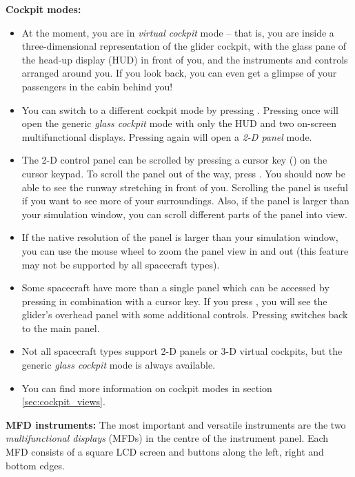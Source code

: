 \documentclass[Orbiter User Manual.tex]{subfiles}
\begin{document}
\textbf{Cockpit modes:}
\begin{itemize}
	\item At the moment, you are in \emph{virtual cockpit} mode -- that is, you
		are inside a three-dimensional representation of the glider cockpit,
		with the glass pane of the head-up display (HUD) in front of you, and
		the instruments and controls arranged around you. If you look back, you
		can even get a glimpse of your passengers in the cabin behind you!
	\item You can switch to a different cockpit mode by pressing .
		Pressing  once will open the generic \emph{glass cockpit}
		mode with only the HUD and two on-screen multifunctional displays.
		Pressing  again will open a \emph{2-D panel} mode.
	\item The 2-D control panel can be scrolled by pressing a cursor key
		(\Arrows\cur{}) on the cursor keypad. To scroll the panel out of the
		way, press \UArrow{}. You should now be able to see the runway
		stretching in front of you. Scrolling the panel is useful if you want to
		see more of your surroundings. Also, if the panel is larger than your
		simulation window, you can scroll different parts of the panel into
		view.
	\item If the native resolution of the panel is larger than your simulation
		window, you can use the mouse wheel to zoom the panel view in and out
		(this feature may not be supported by all spacecraft types).
	\item Some spacecraft have more than a single panel which can be accessed by
		pressing \Ctrl{} in combination
		with a cursor key. If you press \keystroke{\ctrl,\uarrow}, you will see
		the glider's overhead panel with some additional controls. Pressing
		\keystroke{\ctrl,\darrow} switches back to the main panel.
	\item Not all spacecraft types support 2-D panels or 3-D virtual cockpits,
		but the generic \emph{glass cockpit} mode is always available.
	\item You can find more information on cockpit modes in section
		\ref{sec:cockpit_views}.
\end{itemize}

\textbf{MFD instruments:}
The most important and versatile instruments are the two \emph{multifunctional
displays} (MFDs) in the centre of the instrument panel. Each MFD consists of a
square LCD screen and buttons along the left, right and bottom edges.
\end{document}
